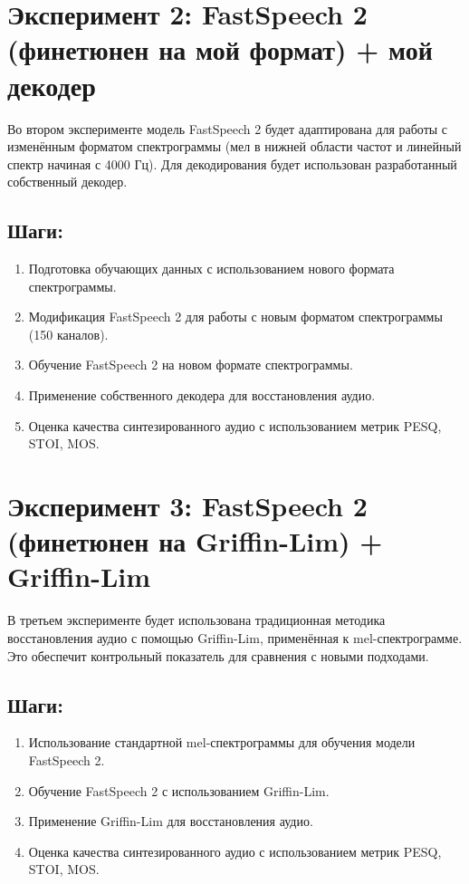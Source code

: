 \section{Эксперимент 2: FastSpeech 2 (финетюнен на мой формат) + мой декодер}

Во втором эксперименте модель FastSpeech 2 будет адаптирована для работы с изменённым форматом спектрограммы (мел в нижней области частот и линейный спектр начиная с 4000 Гц). Для декодирования будет использован разработанный собственный декодер.

\subsection{Шаги:}
\begin{enumerate}
    \item Подготовка обучающих данных с использованием нового формата спектрограммы.
    \item Модификация FastSpeech 2 для работы с новым форматом спектрограммы (150 каналов).
    \item Обучение FastSpeech 2 на новом формате спектрограммы.
    \item Применение собственного декодера для восстановления аудио.
    \item Оценка качества синтезированного аудио с использованием метрик PESQ, STOI, MOS.
\end{enumerate}

\section{Эксперимент 3: FastSpeech 2 (финетюнен на Griffin-Lim) + Griffin-Lim}

В третьем эксперименте будет использована традиционная методика восстановления аудио с помощью Griffin-Lim, применённая к mel-спектрограмме. Это обеспечит контрольный показатель для сравнения с новыми подходами.

\subsection{Шаги:}
\begin{enumerate}
    \item Использование стандартной mel-спектрограммы для обучения модели FastSpeech 2.
    \item Обучение FastSpeech 2 с использованием Griffin-Lim.
    \item Применение Griffin-Lim для восстановления аудио.
    \item Оценка качества синтезированного аудио с использованием метрик PESQ, STOI, MOS.
\end{enumerate}

